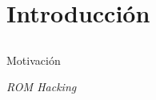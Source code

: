 
\section{Introducción}
\subsection{}

\begin{frame}{Motivación}

\end{frame}

\begin{frame}{\textit{ROM Hacking}}

\end{frame}
